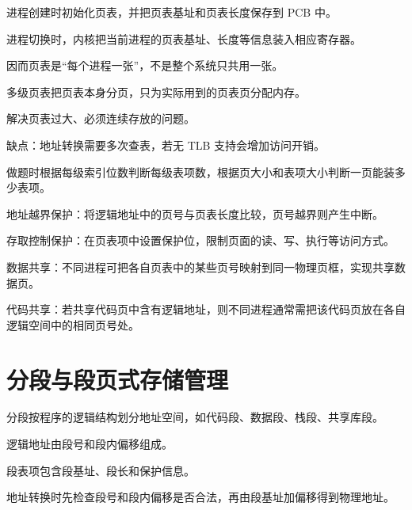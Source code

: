 \begin{points}
  \item 进程创建时初始化页表，并把页表基址和页表长度保存到 PCB 中。
  \item 进程切换时，内核把当前进程的页表基址、长度等信息装入相应寄存器。
  \item 因而页表是“每个进程一张”，不是整个系统只共用一张。
\end{points}


\begin{points}
  \item 多级页表把页表本身分页，只为实际用到的页表页分配内存。
  \item 解决页表过大、必须连续存放的问题。
  \item 缺点：地址转换需要多次查表，若无 TLB 支持会增加访问开销。
  \item 做题时根据每级索引位数判断每级表项数，根据页大小和表项大小判断一页能装多少表项。
\end{points}

\begin{points}
  \item 地址越界保护：将逻辑地址中的页号与页表长度比较，页号越界则产生中断。
  \item 存取控制保护：在页表项中设置保护位，限制页面的读、写、执行等访问方式。
  \item 数据共享：不同进程可把各自页表中的某些页号映射到同一物理页框，实现共享数据页。
  \item 代码共享：若共享代码页中含有逻辑地址，则不同进程通常需把该代码页放在各自逻辑空间中的相同页号处。
\end{points}


\section{分段与段页式存储管理}
\begin{points}
  \item 分段按程序的逻辑结构划分地址空间，如代码段、数据段、栈段、共享库段。
  \item 逻辑地址由段号和段内偏移组成。
  \item 段表项包含段基址、段长和保护信息。
  \item 地址转换时先检查段号和段内偏移是否合法，再由段基址加偏移得到物理地址。
\end{points}

